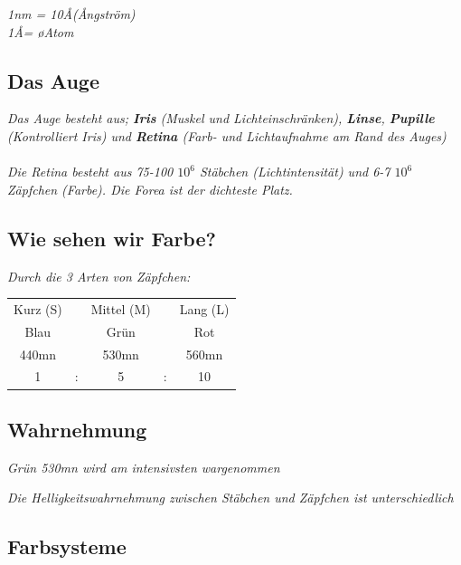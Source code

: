\textit{1nm = 10\AA (\AA ngström)} \\
\textit{1\AA = \o Atom}

\subsection{Das Auge}

\textit{
    Das Auge besteht aus; \textbf{Iris} (Muskel und Lichteinschränken),
    \textbf{Linse}, \textbf{Pupille} (Kontrolliert Iris) und \textbf{Retina}
    (Farb- und Lichtaufnahme am Rand des Auges)
} \\
\\
\textit{
    Die Retina besteht aus 75-100 $10^6$ Stäbchen (Lichtintensität) und
    6-7 $10^6$ Zäpfchen (Farbe). Die Forea ist der dichteste Platz.
}

\subsection{Wie sehen wir Farbe?}

\textit{Durch die 3 Arten von Zäpfchen:}

\begin{tabular}{ccccc}
    Kurz (S) & & Mittel (M) & & Lang (L) \\
    Blau     & & Grün       & & Rot \\
    440mn    & & 530mn      & & 560mn \\
    1        &:& 5          &:& 10 \\
\end{tabular}

\subsection{Wahrnehmung}

\textit{Grün 530mn wird am intensivsten wargenommen}

\textit{
    Die Helligkeitswahrnehmung zwischen Stäbchen und
    Zäpfchen ist unterschiedlich
}

\subsection{Farbsysteme}

